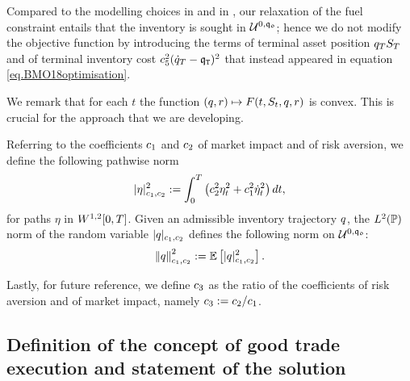 \documentclass[10pt,a4paper]{article}
\begin{document}
	
	Compared to the modelling choices in \cite{LN19inc} and in \cite{BMO18opt}, our relaxation of the fuel constraint entails that the inventory is sought in $\spaceUnbiasedInventoryTrajectoriesInitialConstraint$; hence we do not modify the objective function by introducing the terms of terminal asset position $\inventory_\timeHorizon \fundamentalPrice_\timeHorizon$ and of terminal inventory cost $\coeffPenalisationOutstandingInventory \squared (\inventoryRate_\timeHorizon - \liquidationTarget)\squared$ that instead appeared in equation \eqref{eq.BMO18optimisation}.
	
	We remark that for each $t$ the function $(\inventory,r)\mapsto F(t,\fundamentalPrice_t, \inventory,r)$ is convex. This is crucial for the approach that we are developing. 
	
	Referring to the coefficients $\coeffMarketImpact$ and $\coeffRiskAversion$ of market impact and of risk aversion, we define the following pathwise norm
	\begin{equation}\label{eq.pathwiseSobolevNormIC}
	\lvert \eta \rvert_{\coeffMarketImpact,\coeffRiskAversion}\squared := \intZeroTimeHorizon \left( \coeffRiskAversion\squared \eta_t \squared + \coeffMarketImpact\squared \dotEta_t\squared \right)dt,
	\end{equation}
	for paths $\eta$ in $\sobolevSpaceOneTwo\timeWindow$. Given an admissible inventory trajectory $\inventory$, the $\Ltwo(\Prob)$ norm of the random variable $\lvert \inventory \rvert_{\coeffMarketImpact,\coeffRiskAversion}$ defines the following norm on $\spaceUnbiasedInventoryTrajectoriesInitialConstraint$: 
	\begin{equation}\label{eq.sobolevNormOfInventoryTrajectoryIC}
	\norm[\inventory]_{\coeffMarketImpact,\coeffRiskAversion}\squared: = \Expectation\left[\lvert \inventory \rvert_{\coeffMarketImpact,\coeffRiskAversion}\squared \right].
	\end{equation}
	
	Lastly, for future reference, we define $\ratioAversionOverImpact$ as the ratio of the coefficients of risk aversion and of market impact, namely $\ratioAversionOverImpact := \coeffRiskAversion/\coeffMarketImpact$. 
	
	\subsection{Definition of the concept of good trade execution and statement of the solution}\label{sec.statementOfGoodTradeExecutionIC}
	
\end{document}
